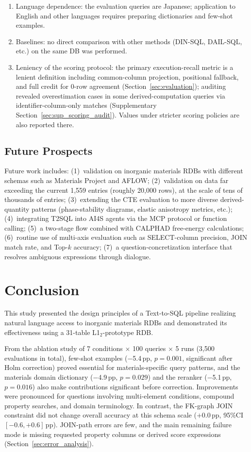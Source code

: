 \begin{enumerate}[nosep]
  \item Language dependence: the evaluation queries are Japanese; application to English and other languages requires preparing dictionaries and few-shot examples.
  \item Baselines: no direct comparison with other methods (DIN-SQL, DAIL-SQL, etc.) on the same DB was performed.
  \item Leniency of the scoring protocol: the primary execution-recall metric is a lenient definition including common-column projection, positional fallback, and full credit for 0-row agreement (Section~\ref{sec:evaluation}); auditing revealed overestimation cases in some derived-computation queries via identifier-column-only matches (Supplementary Section~\ref{sec:sup_scoring_audit}). Values under stricter scoring policies are also reported there.
\end{enumerate}


\subsection{Future Prospects}

Future work includes: (1)~validation on inorganic materials RDBs with different schemas such as Materials Project and AFLOW; (2)~validation on data far exceeding the current 1{,}559 entries (roughly 20,000 rows), at the scale of tens of thousands of entries; (3)~extending the CTE evaluation to more diverse derived-quantity patterns (phase-stability diagrams, elastic anisotropy metrics, etc.); (4)~integrating T2SQL into AI4S agents via the MCP protocol or function calling; (5)~a two-stage flow combined with CALPHAD free-energy calculations; (6)~routine use of multi-axis evaluation such as SELECT-column precision, JOIN match rate, and Top-$k$ accuracy; (7)~a question-concretization interface that resolves ambiguous expressions through dialogue.

\section{Conclusion}\label{sec:conclusion}

This study presented the design principles of a Text-to-SQL pipeline realizing natural language access to inorganic materials RDBs and demonstrated its effectiveness using a 31-table L1$_2$-prototype RDB.

From the ablation study of 7 conditions $\times$ 100 queries $\times$ 5 runs (3{,}500 evaluations in total), few-shot examples ($-$5.4\,pp, $p=0.001$, significant after Holm correction) proved essential for materials-specific query patterns, and the materials domain dictionary ($-$4.9\,pp, $p=0.029$) and the reranker ($-$5.1\,pp, $p=0.016$) also make contributions significant before correction. Improvements were pronounced for questions involving multi-element conditions, compound property searches, and domain terminology. In contrast, the FK-graph JOIN constraint did not change overall accuracy at this schema scale ($+$0.0\,pp, 95\%CI $[-0.6, +0.6]$\,pp). JOIN-path errors are few, and the main remaining failure mode is missing requested property columns or derived score expressions (Section~\ref{sec:error_analysis}).

